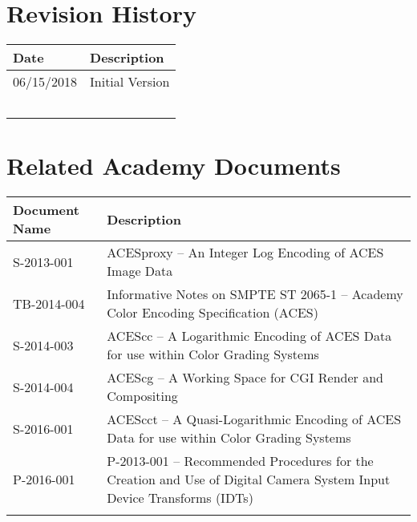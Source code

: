 \prelimsectionformat	%
\chapter{Revision History}

\begin{tabularx}{\linewidth}{|l|X|}
    \hline
    Date       & Description      \\ \hline
    06/15/2018 & Initial Version  \\ \hline
    & \\ \hline
    & \\ \hline
    & \\ \hline
    & \\ \hline
    & \\ \hline
\end{tabularx}

\vspace{0.25in} %
\chapter{Related Academy Documents} %
\begin{tabularx}{\linewidth}{|l|X|}
    \hline
    Document Name & Description \\ \hline
    S-2013-001  &  ACESproxy -- An Integer Log Encoding of ACES Image Data \\ \hline
    TB-2014-004 &  Informative Notes on SMPTE ST 2065-1 -- Academy Color Encoding Specification (ACES) \\ \hline
    S-2014-003  &  ACEScc -- A Logarithmic Encoding of ACES Data for use within Color Grading Systems   \\ \hline
    S-2014-004  &  ACEScg -- A Working Space for CGI Render and Compositing \\ \hline
    S-2016-001  &  ACEScct -- A Quasi-Logarithmic Encoding of ACES Data for use within Color Grading Systems \\ \hline
    P-2016-001  &  P-2013-001 -- Recommended  Procedures  for  the  Creation  and  Use  of  Digital  Camera  System  Input Device Transforms (IDTs) \\ \hline
    & \\ \hline
\end{tabularx}